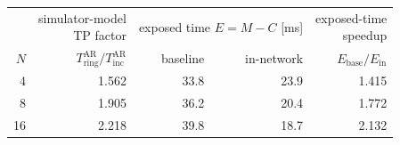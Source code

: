 \begin{tabular}{r r r r r}
  \toprule
  & \shortstack{simulator-model\\TP factor}
  & \multicolumn{2}{c}{exposed time $E=M-C$ [ms]}
  & \shortstack{exposed-time\\speedup} \\
  \cmidrule(lr){3-4}
  $N$ & $T_{\mathrm{ring}}^{\mathrm{AR}}/T_{\mathrm{inc}}^{\mathrm{AR}}$
      & baseline & in-network & $E_{\mathrm{base}}/E_{\mathrm{in}}$ \\
  \midrule
   4 & 1.562 & 33.8 & 23.9 & 1.415 \\
   8 & 1.905 & 36.2 & 20.4 & 1.772 \\
  16 & 2.218 & 39.8 & 18.7 & 2.132 \\
  \bottomrule
\end{tabular}
